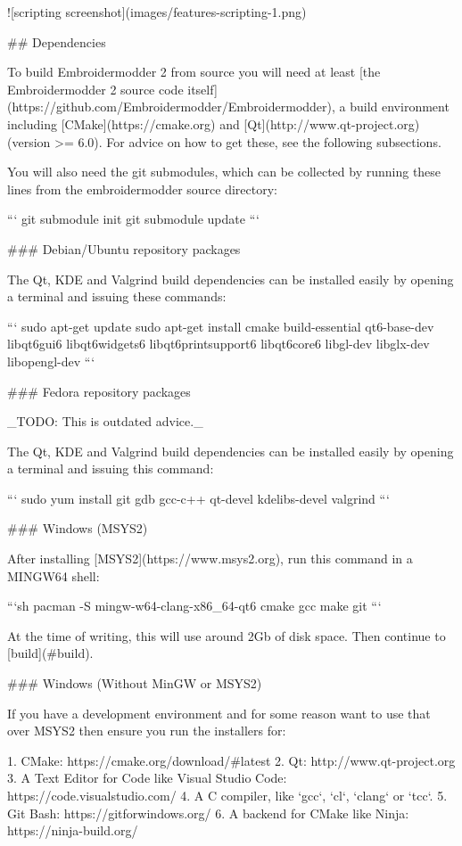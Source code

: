 ![scripting screenshot](images/features-scripting-1.png)

## Dependencies

To build Embroidermodder 2 from source you will need at least
[the Embroidermodder 2 source code itself](https://github.com/Embroidermodder/Embroidermodder),
a build environment including [CMake](https://cmake.org) and [Qt](http://www.qt-project.org) (version >= 6.0). For advice on how to get these,
see the following subsections.

You will also need the git submodules, which can be collected by running these lines
from the embroidermodder source directory:

```
git submodule init
git submodule update
```

### Debian/Ubuntu repository packages

The Qt, KDE and Valgrind build dependencies can be installed easily by
opening a terminal and issuing these commands:

```
sudo apt-get update
sudo apt-get install cmake build-essential qt6-base-dev libqt6gui6 libqt6widgets6 libqt6printsupport6 libqt6core6 libgl-dev libglx-dev libopengl-dev
```

### Fedora repository packages

_TODO: This is outdated advice._

The Qt, KDE and Valgrind build dependencies can be installed easily
by opening a terminal and issuing this command:

```
sudo yum install git gdb gcc-c++ qt-devel kdelibs-devel valgrind
```

### Windows (MSYS2)

After installing [MSYS2](https://www.msys2.org), run this command in a MINGW64 shell:

```sh
pacman -S mingw-w64-clang-x86_64-qt6 cmake gcc make git
```

At the time of writing, this will use around 2Gb of disk space. Then continue to [build](#build).

### Windows (Without MinGW or MSYS2)

If you have a development environment and for some reason want to use that over MSYS2 then ensure you run the installers for:

1. CMake: https://cmake.org/download/#latest
2. Qt: http://www.qt-project.org
3. A Text Editor for Code like Visual Studio Code: https://code.visualstudio.com/
4. A C compiler, like `gcc`, `cl`, `clang` or `tcc`.
5. Git Bash: https://gitforwindows.org/
6. A backend for CMake like Ninja: https://ninja-build.org/

